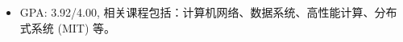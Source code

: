 
\begin{itemize}[nosep]
  \item GPA: 3.92/4.00, 相关课程包括：计算机网络、数据系统、高性能计算、分布式系统 (MIT) 等。
\end{itemize}
